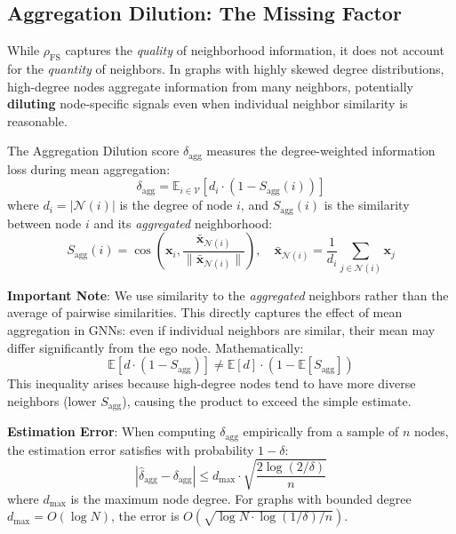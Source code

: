 \subsection{Aggregation Dilution: The Missing Factor}
\label{sec:aggregation_dilution}

While $\rho_{\text{FS}}$ captures the \textit{quality} of neighborhood information, it does not account for the \textit{quantity} of neighbors. In graphs with highly skewed degree distributions, high-degree nodes aggregate information from many neighbors, potentially \textbf{diluting} node-specific signals even when individual neighbor similarity is reasonable.

\begin{definition}
\label{def:agg_dilution}
The Aggregation Dilution score $\delta_{\text{agg}}$ measures the degree-weighted information loss during mean aggregation:
\begin{equation}
\delta_{\text{agg}} = \mathbb{E}_{i \in \mathcal{V}}\left[ d_i \cdot \left(1 - S_{\text{agg}}(i)\right) \right]
\end{equation}
where $d_i = |\mathcal{N}(i)|$ is the degree of node $i$, and $S_{\text{agg}}(i)$ is the similarity between node $i$ and its \textit{aggregated} neighborhood:
\begin{equation}
S_{\text{agg}}(i) = \cos\left(\mathbf{x}_i, \frac{\bar{\mathbf{x}}_{\mathcal{N}(i)}}{\|\bar{\mathbf{x}}_{\mathcal{N}(i)}\|}\right), \quad \bar{\mathbf{x}}_{\mathcal{N}(i)} = \frac{1}{d_i}\sum_{j \in \mathcal{N}(i)} \mathbf{x}_j
\end{equation}

\textbf{Important Note}: We use similarity to the \textit{aggregated} neighbors rather than the average of pairwise similarities. This directly captures the effect of mean aggregation in GNNs: even if individual neighbors are similar, their mean may differ significantly from the ego node. Mathematically:
\begin{equation}
\mathbb{E}[d \cdot (1 - S_{\text{agg}})] \neq \mathbb{E}[d] \cdot (1 - \mathbb{E}[S_{\text{agg}}])
\end{equation}
This inequality arises because high-degree nodes tend to have more diverse neighbors (lower $S_{\text{agg}}$), causing the product to exceed the simple estimate.

\textbf{Estimation Error}: When computing $\delta_{\text{agg}}$ empirically from a sample of $n$ nodes, the estimation error satisfies with probability $1 - \delta$:
\begin{equation}
\left|\hat{\delta}_{\text{agg}} - \delta_{\text{agg}}\right| \leq d_{\max} \cdot \sqrt{\frac{2\log(2/\delta)}{n}}
\end{equation}
where $d_{\max}$ is the maximum node degree. For graphs with bounded degree $d_{\max} = O(\log N)$, the error is $O(\sqrt{\log N \cdot \log(1/\delta)/n})$.
\end{definition}

